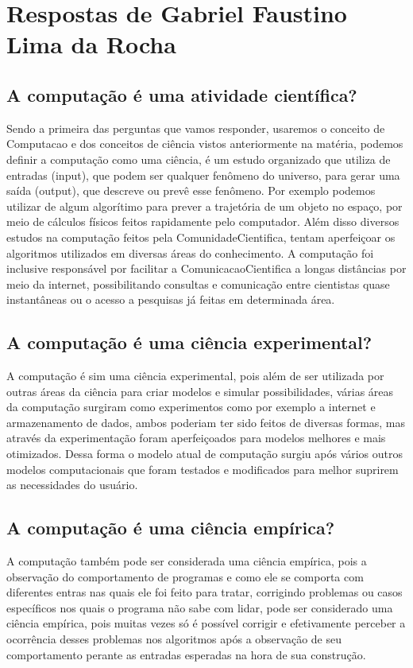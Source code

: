 \section{Respostas de Gabriel Faustino Lima da Rocha}

\subsection{A computação é uma atividade científica?}

Sendo a primeira das perguntas que vamos responder, usaremos o conceito de \gls{Computacao} e dos conceitos de ciência vistos anteriormente na matéria, podemos definir a computação como uma ciência, é um estudo organizado que utiliza de entradas (input), que podem ser qualquer fenômeno do universo, para gerar uma saída (output), que descreve ou prevê esse fenômeno. Por exemplo podemos utilizar de algum algorítimo para prever a trajetória de um objeto no espaço, por meio de cálculos físicos feitos rapidamente pelo computador. Além disso diversos estudos na computação feitos pela \gls{ComunidadeCientifica}, tentam aperfeiçoar os algoritmos utilizados em diversas áreas do conhecimento. A computação foi inclusive responsável por facilitar a \gls{ComunicacaoCientifica} a longas distâncias por meio da internet, possibilitando consultas e comunicação entre cientistas quase instantâneas ou o acesso a pesquisas já feitas em determinada área. 

\subsection{A computação é uma ciência experimental?}
A computação é sim uma ciência experimental, pois além de ser utilizada por outras áreas da ciência para criar modelos e simular possibilidades, várias áreas da computação surgiram como experimentos como por exemplo a internet e armazenamento de dados, ambos poderiam ter sido feitos de diversas formas, mas através da experimentação foram aperfeiçoados para modelos melhores e mais otimizados. Dessa forma o modelo atual de computação surgiu após vários outros modelos computacionais que foram testados e modificados para melhor suprirem as necessidades do usuário.

\subsection{A computação é uma ciência empírica?}
A computação também pode ser considerada uma ciência empírica, pois a observação do comportamento de programas e como ele se comporta com diferentes entras nas quais ele foi feito para tratar, corrigindo problemas ou casos específicos nos quais o programa não sabe com lidar, pode ser considerado uma ciência empírica, pois muitas vezes só é possível corrigir e efetivamente perceber a ocorrência desses problemas nos algoritmos após a observação de seu comportamento perante as entradas esperadas na hora de sua construção.